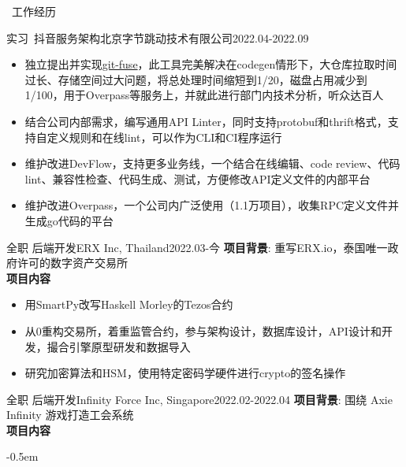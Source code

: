\documentclass[UTF8]{resume}
\begin{document}
\begin{rSection}{\faBriefcase~工作经历}
    \begin{rExperience}{实习~抖音服务架构}{北京字节跳动技术有限公司}{2022.04-2022.09}
        \begin{itemize}
            \itemsep -0.5em \vspace{-0.5em}
            \item 独立提出并实现\href{https://github.com/qiujiangkun/git-fuse}{git-fuse}，此工具完美解决在codegen情形下，大仓库拉取时间过长、存储空间过大问题，将总处理时间缩短到1/20，磁盘占用减少到1/100，用于Overpass等服务上，并就此进行部门内技术分析，听众达百人
            \item 结合公司内部需求，编写通用API Linter，同时支持protobuf和thrift格式，支持自定义规则和在线lint，可以作为CLI和CI程序运行
            \item 维护改进DevFlow，支持更多业务线，一个结合在线编辑、code review、代码lint、兼容性检查、代码生成、测试，方便修改API定义文件的内部平台
            \item 维护改进Overpass，一个公司内广泛使用（1.1万项目），收集RPC定义文件并生成go代码的平台
        \end{itemize}
    \end{rExperience}
    \begin{rExperience}{全职 后端开发}{ERX Inc, Thailand}{2022.03-今}
        \textbf{项目背景}:
        重写ERX.io，泰国唯一政府许可的数字资产交易所\\
        \textbf{项目内容}
        \begin{itemize}
            \itemsep -0.5em \vspace{-0.5em}
            \item 用SmartPy改写Haskell Morley的Tezos合约
            \item 从0重构交易所，着重监管合约，参与架构设计，数据库设计，API设计和开发，撮合引擎原型研发和数据导入
            \item 研究加密算法和HSM，使用特定密码学硬件进行crypto的签名操作
        \end{itemize}
    \end{rExperience}
    \begin{rExperience}{全职 后端开发}{Infinity Force Inc, Singapore}{2022.02-2022.04}
        \textbf{项目背景}:
        围绕 Axie Infinity 游戏打造工会系统\\
        \textbf{项目内容}
        \begin{itemize}
            \itemsep -0.5em \vspace{-0.5em}

\end{itemize}
\end{rExperience}
\end{rSection}
\end{document}
